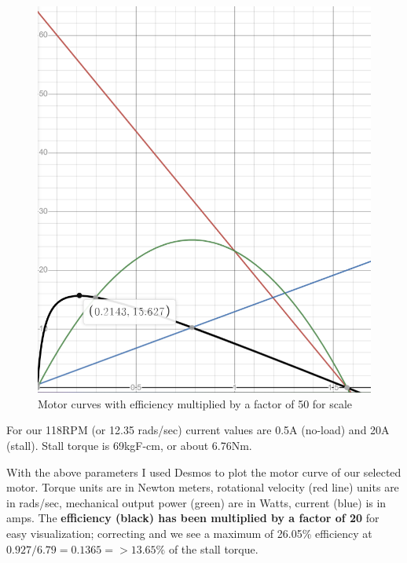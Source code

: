 \documentclass[a4paper, 10pt]{article}
\begin{document}
		\begin{figure} [!h]
			\centering
			\includegraphics[scale=0.5]{Photos/motor_curves_612}
			\caption{Motor curves with efficiency multiplied by a factor of 50 for scale}
			\label{motor_curves_612}
		\end{figure}
		
		For our 118RPM (or 12.35 rads/sec) current values are 0.5A (no-load) and 20A (stall). Stall torque is 69kgF-cm, or about 6.76Nm. 
		
		With the above parameters I used Desmos to plot the motor curve of our selected motor. Torque units are in Newton meters, rotational velocity (red line) units are in rads/sec, mechanical output power (green) are in Watts, current (blue) is in amps. The \textbf{efficiency (black) has been multiplied by a factor of 20} for easy visualization; correcting and we see a maximum of 26.05\% efficiency at $ 0.927/6.79 = 0.1365 => 13.65\% $ of the stall torque. 
		
\end{document}
